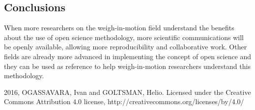 \documentclass[a0,portrait]{a0poster}
\begin{document}
\begin{multicols}{2}
\color{black} %

\section*{Conclusions}

When more researchers on the weigh-in-motion field understand the benefits about the use of open science methodology, more scientific communications will be openly available, allowing more reproducibility and collaborative work. Other fields are already more advanced in implementing the concept of open science and they can be used as reference to help weigh-in-motion researchers understand this methodology.


\nocite{*} %

\end{multicols}

\large 
\vspace{1cm}

\begin{center}
2016, OGASSAVARA, Ivan and GOLTSMAN, Helio. Licensed under the Creative Commons Attribution 4.0 license, http://creativecommons.org/licenses/by/4.0/
\end{center}
\end{document}
